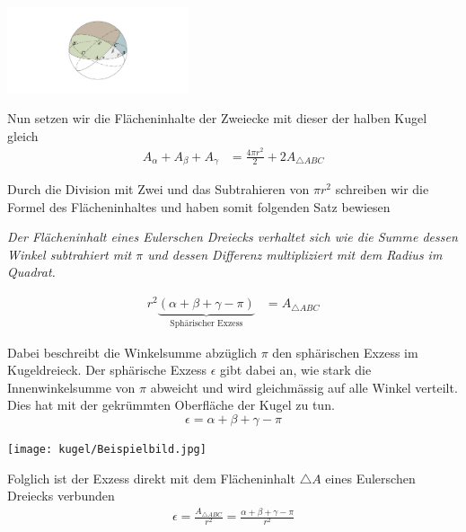 \begin{refsection}
\begin{center}
        \includegraphics[width=0.4\textwidth]{kugel/1HalbeKugel.jpg}
\end{center}

Nun setzen wir die Flächeninhalte der Zweiecke mit dieser der halben Kugel gleich
\begin{align*}
A_{ \alpha } + A_{ \beta } + A_{ \gamma } &= \frac{ 4\pi r^{ 2 } }{ 2 } + 2A_{ \triangle{ ABC }}
\end{align*}

Durch die Division mit Zwei und das Subtrahieren von $\pi r^2$ schreiben wir die Formel des Flächeninhaltes und haben somit folgenden Satz bewiesen
\begin{satz} \textit{Der Flächeninhalt eines Eulerschen Dreiecks verhaltet sich wie die Summe dessen Winkel subtrahiert mit $\pi$ und dessen Differenz multipliziert mit dem Radius im Quadrat.}
\label{skript:kugel:satz:Flaecheninhalt}
\end{satz}

\begin{align*}
r^{ 2 }\underbrace{(\alpha + \beta + \gamma - \pi)}_{\text{Sphärischer Exzess}} &= A_{ \triangle{ ABC }}  
\end{align*}

Dabei beschreibt die Winkelsumme abzüglich $\pi$ den sphärischen Exzess im Kugeldreieck.
Der sphärische Exzess $\epsilon$ gibt dabei an, wie stark die Innenwinkelsumme von $\pi$ abweicht und wird gleichmässig auf alle Winkel verteilt. Dies hat mit der gekrümmten Oberfläche der Kugel zu tun.
\begin{equation}
\epsilon = \alpha + \beta + \gamma - \pi
\end{equation}

\begin{center}
        \texttt{[image: kugel/Beispielbild.jpg]}
\end{center}

Folglich ist der Exzess direkt mit dem Flächeninhalt $\triangle A$ eines Eulerschen Dreiecks verbunden
\begin{align*}
\epsilon =\frac{A_{\triangle{ ABC }}}{r^2} = \frac{\alpha + \beta + \gamma - \pi}{r^2}
\end{align*}


\end{refsection}
